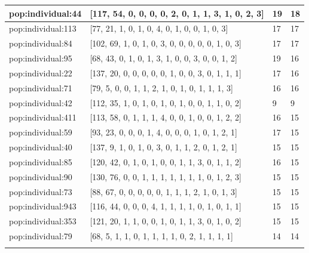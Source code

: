 \begin{table}
\begin{tabular}{p{3cm} p{4cm} p{3cm} p{3cm}}
\small{pop:individual:44} & \small{[117, 54, 0, 0, 0, 0, 2, 0, 1, 1, 3, 1, 0, 2, 3]} 
& \small{19} & \small{18}\\ \hline 
\small{pop:individual:113} & \small{[77, 21, 1, 0, 1, 0, 4, 0, 1, 0, 0, 1, 0, 3]} 
& \small{17} & \small{17}\\ \hline 
\small{pop:individual:84} & \small{[102, 69, 1, 0, 1, 0, 3, 0, 0, 0, 0, 0, 1, 0, 3]} 
& \small{17} & \small{17}\\ \hline 
\small{pop:individual:95} & \small{[68, 43, 0, 1, 0, 1, 3, 1, 0, 0, 3, 0, 0, 1, 2]} 
& \small{19} & \small{16}\\ \hline 
\small{pop:individual:22} & \small{[137, 20, 0, 0, 0, 0, 0, 1, 0, 0, 3, 0, 1, 1, 1]} 
& \small{17} & \small{16}\\ \hline 
\small{pop:individual:71} & \small{[79, 5, 0, 0, 1, 1, 2, 1, 0, 1, 0, 1, 1, 1, 3]} 
& \small{16} & \small{16}\\ \hline 
\small{pop:individual:42} & \small{[112, 35, 1, 0, 1, 0, 1, 0, 1, 0, 0, 1, 1, 0, 2]} 
& \small{9} & \small{9}\\ \hline 
\small{pop:individual:411} & \small{[113, 58, 0, 1, 1, 1, 4, 0, 0, 1, 0, 0, 1, 2, 2]} 
& \small{16} & \small{15}\\ \hline 
\small{pop:individual:59} & \small{[93, 23, 0, 0, 0, 1, 4, 0, 0, 0, 1, 0, 1, 2, 1]} 
& \small{17} & \small{15}\\ \hline 
\small{pop:individual:40} & \small{[137, 9, 1, 0, 1, 0, 3, 0, 1, 1, 2, 0, 1, 2, 1]} 
& \small{15} & \small{15}\\ \hline 
\small{pop:individual:85} & \small{[120, 42, 0, 1, 0, 1, 0, 0, 1, 1, 3, 0, 1, 1, 2]} 
& \small{16} & \small{15}\\ \hline 
\small{pop:individual:90} & \small{[130, 76, 0, 0, 1, 1, 1, 1, 1, 1, 1, 0, 1, 2, 3]} 
& \small{15} & \small{15}\\ \hline 
\small{pop:individual:73} & \small{[88, 67, 0, 0, 0, 0, 0, 1, 1, 1, 2, 1, 0, 1, 3]} 
& \small{15} & \small{15}\\ \hline 
\small{pop:individual:943} & \small{[116, 44, 0, 0, 0, 4, 1, 1, 1, 1, 0, 1, 0, 1, 1]} 
& \small{15} & \small{15}\\ \hline 
\small{pop:individual:353} & \small{[121, 20, 1, 1, 0, 0, 1, 0, 1, 1, 3, 0, 1, 0, 2]} 
& \small{15} & \small{15}\\ \hline  
\small{pop:individual:79} & \small{[68, 5, 1, 1, 0, 1, 1, 1, 1, 0, 2, 1, 1, 1, 1]} 
& \small{14} & \small{14}\\ \hline   
\noalign{\smallskip}\hline
\end{tabular}
\end{table}

